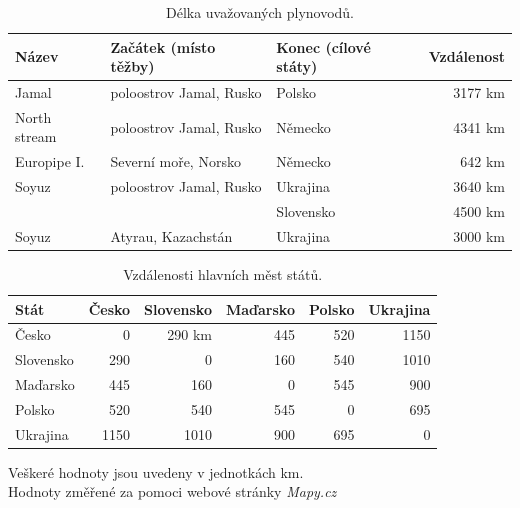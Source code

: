 \documentclass[a4paper,11pt]{article}
\begin{document}
\begin{table}[h!]
\begin{center}
\begin{tabular}{|l|l|l|r|}
    \hline
    Název 			& Začátek (místo těžby)	& Konec (cílové státy) 		& Vzdálenost\\
    \hline 
    Jamal			& poloostrov Jamal, Rusko	& Polsko				& 3177 km\\ 
    North stream\footnotemark 	& poloostrov Jamal, Rusko & Německo	& 4341 km\\
    Europipe I. 		& Severní moře, Norsko 		& Německo  			& 642 km\\
    Soyuz 			& poloostrov Jamal, Rusko 	& Ukrajina 			& 3640 km\\
					&							& Slovensko			& 4500 km\\
	Soyuz 			& Atyrau, Kazachstán	 		& Ukrajina			& 3000 km\\		 
    \hline
\end{tabular}
\caption{Délka uvažovaných plynovodů.} 
\label{plynovody}
\end{center}
\end{table}


\begin{table}[h!]
\begin{center}
\begin{tabular}{|l|r|r|r|r|r|}
    \hline
    Stát 			& Česko		& Slovensko 		& Maďarsko	& Polsko & Ukrajina\\
    \hline 
    Česko			& 0		& 290 km		& 445	& 520    & 1150\\ 
    Slovensko 		& 290	& 0			& 160	& 540    & 1010\\
    Maďarsko 		& 445	& 160		& 0		& 545 	 & 900\\
    Polsko 			& 520	& 540		& 545 	& 0		 & 695\\
	Ukrajina			& 1150	& 1010		& 900	& 695	 & 0	\\
    \hline
\end{tabular}
\caption{Vzdálenosti hlavních měst států.} 
Veškeré hodnoty jsou uvedeny v jednotkách km.\\
Hodnoty změřené za pomoci webové stránky \textit{Mapy.cz}\footnotemark
\label{staty}
\end{center}
\end{table}
\end{document}
